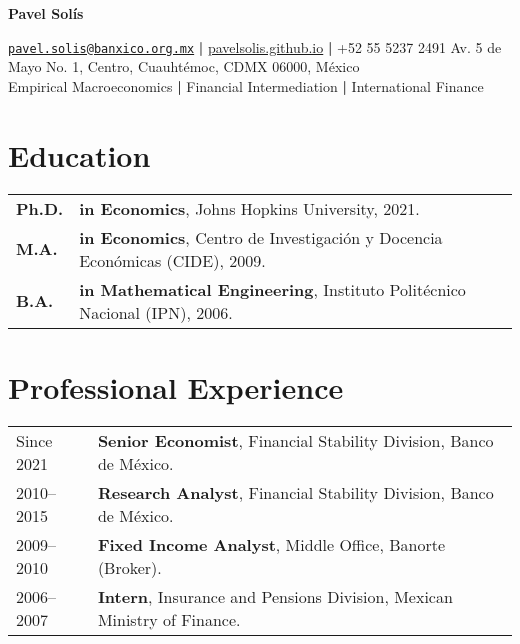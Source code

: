 \documentclass[12pt]{article}
\newcommand{\vsect}{\vspace{0.08cm}}
\begin{document}
	\pagestyle{plain}								%
	\centerline{\Large \textbf{Pavel Solís}}

\hypersetup{colorlinks,urlcolor=black}
\begin{center}
	\faEnvelope \enskip 
	\href{mailto:pavel.solis@banxico.org.mx}{\texttt{pavel.solis@banxico.org.mx}}  \textbf{|} 
	\faGlobe \enskip 
	\url{pavelsolis.github.io} \textbf{|} %
	\faPhone \enskip 
	+52 55 5237 2491 \newline %
	\faMapMarker \enskip 
	Av. 5 de Mayo No. 1, Centro, Cuauhtémoc, CDMX 06000, México \\
	\faSearch \enskip 
	Empirical Macroeconomics \textbf{|} Financial Intermediation \textbf{|} International Finance \\
\end{center}	
	
	\section{Education}
	\vsect
	\begin{tabular}{l@{\hskip 0.04in}l}
	\textbf{Ph.D.} & \textbf{in Economics}, Johns Hopkins University, 2021. \\
	\textbf{M.A.} & \textbf{in Economics}, Centro de Investigación y Docencia Económicas (CIDE), 2009. \\ %
	\textbf{B.A.} & \textbf{in Mathematical Engineering}, Instituto Politécnico Nacional (IPN), 2006. %
	\end{tabular}

	
	\section{Professional Experience}
	\vsect
	\begin{tabular}[l]{ll}
		Since 2021 & \textbf{Senior Economist}, Financial Stability Division, Banco de México. \\
		2010–2015 & \textbf{Research Analyst}, Financial Stability Division, Banco de México. \\
		2009–2010 & \textbf{Fixed Income Analyst}, Middle Office, Banorte (Broker). \\
		2006–2007 & \textbf{Intern}, Insurance and Pensions Division, Mexican Ministry of Finance. %
	\end{tabular}
\end{document}
